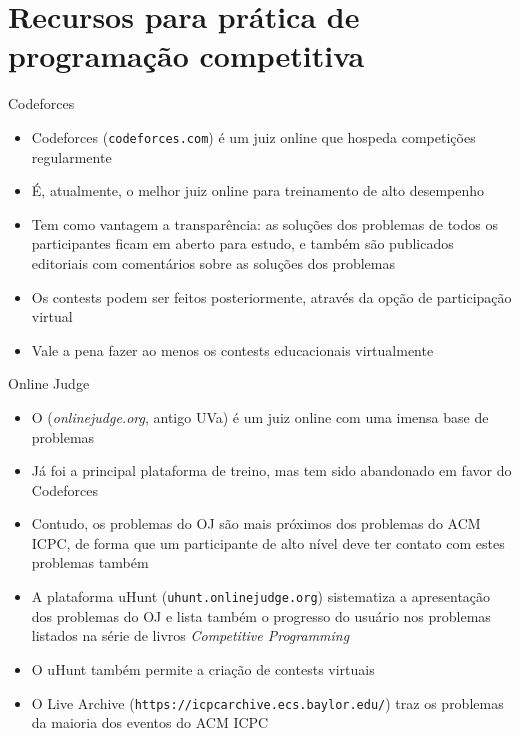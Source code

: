 \section{Recursos para prática de programação competitiva}

\begin{frame}[fragile]{Codeforces}

    \begin{itemize}
        \item Codeforces (\texttt{codeforces.com}) é um juiz online que hospeda competições
            regularmente

        \item É, atualmente, o melhor juiz online para treinamento de alto desempenho

        \item Tem como vantagem a transparência: as soluções dos problemas de todos os
            participantes ficam em aberto para estudo, e também são publicados editoriais
            com comentários sobre as soluções dos problemas

        \item Os contests podem ser feitos posteriormente, através da opção de participação
            virtual

        \item Vale a pena fazer ao menos os contests educacionais virtualmente

    \end{itemize}

\end{frame}

\begin{frame}[fragile]{Online Judge}

    \begin{itemize}
        \item O (\textit{onlinejudge.org}, antigo UVa) é um juiz online com uma imensa base de
            problemas

        \item Já foi a principal plataforma de treino, mas tem sido abandonado em favor do
            Codeforces

        \item Contudo, os problemas do OJ são mais próximos dos problemas do ACM ICPC,
            de forma que um participante de alto nível deve ter contato com estes problemas
            também

        \item A plataforma uHunt (\texttt{uhunt.onlinejudge.org}) sistematiza a apresentação
            dos problemas do OJ e lista também o progresso do usuário nos problemas listados
            na série de livros \textit{Competitive Programming}

        \item O uHunt também permite a criação de contests virtuais

        \item O Live Archive (\texttt{https://icpcarchive.ecs.baylor.edu/}) traz os problemas
            da maioria dos eventos do ACM ICPC
    \end{itemize}

\end{frame}

